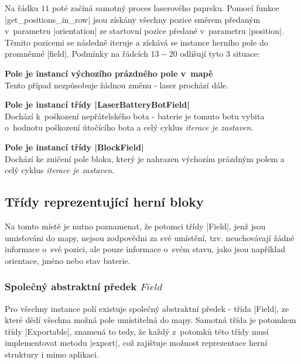 
Na řádku $11$ poté začíná samotný proces laserového paprsku. Pomocí funkce \ic|get_positions_in_row| jsou získány všechny pozice směrem předaným v~parametru \ic|orientation| ze startovní pozice předané v~parametru \ic|position|. Těmito pozicemi se následně iteruje a získává se instance herního pole do promněnné \ic|field|. Podmínky na řádcích $13-20$ odlišují tyto 3 situace:
\begin{description}
    \item {\bfseries Pole je instancí výchozího prázdného pole v~mapě} \\
        Tento případ nezpůsobuje žádnou změnu - laser prochází dále.

    \item {\bfseries Pole je instancí třídy \ic|LaserBatteryBotField|} \\
        Dochází k~poškození nepřátelského bota - baterie je tomuto botu vybita o~hodnotu poškození útočícího bota a celý cyklus \emph{iterace je zastaven}.

    \item {\bfseries Pole je instancí třídy \ic|BlockField|} \\
        Dochází ke zničení pole bloku, který je nahrazen výchozím prázdným polem a celý cyklus \emph{iterace je zastaven}.
\end{description}

\subsection{Třídy reprezentující herní bloky}

Na tomto místě je nutno poznamenat, že potomci třídy \ic|Field|, jenž jsou umisťováni do mapy, nejsou zodpovědni za své umístění, tzv. neuchovávají žádné informace o~své pozici, ale pouze informace o~svém stavu, jako jsou například orientace, jméno nebo stav baterie. 

\subsubsection{Společný abstraktní předek $Field$}

\begin{sloppypar}
	Pro všechny instance polí existuje společný abstraktní předek - třída \ic|Field|, ze které dědí všechna možná pole umístitelná do mapy. Samotná třída je potomkem třídy \ic|Exportable|, znamená to tedy, že každý z~potomků této třídy musí implementovat metodu \ic|export|, což zajištuje možnost reprezentace herní struktury i mimo aplikaci.
\end{sloppypar}

